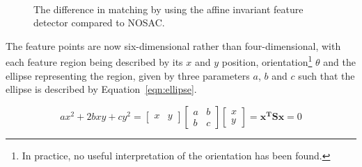 \documentclass[11pt, onecolumn, a4paper, final]{report} %
\begin{document}
\begin{figure}[h!tb]
\centering 
{}
\\
\caption{The difference in matching by using the affine invariant feature detector compared to NOSAC.}
\label{fig:affinenosac}
\end{figure}

The feature points are now six-dimensional rather than four-dimensional, with each feature region being described by its $x$ and $y$ position, orientation\footnote{In practice, no useful interpretation of the orientation has been found.} $\theta$ and the ellipse representing the region, given by three parameters $a$, $b$ and $c$ such that the ellipse is described by Equation~\ref{eqn:ellipse}.

\begin{equation}
ax^2 + 2bxy + cy^2 = 
\left[ \begin{array}{cc}
x & y
\end{array}\right]
\left[ \begin{array}{cc}
a & b \\
b & c
\end{array}\right]
\left[ \begin{array}{c}
x\\
y
\end{array}\right]
=
\mathbf{x^T}\mathbf{S}\mathbf{x}
= 0
\label{eqn:ellipse}
\end{equation} 
\end{document}
